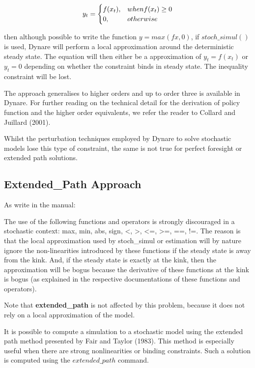 \documentclass[cn,10pt,math=newtx,citestyle=gb7714-2015,bibstyle=gb7714-2015]{elegantbook}
\begin{document}
\begin{equation*}
	y_t=
	\begin{cases}
		f(x_t),& when f(x_t)\ge0\\
		0,\space &otherwise
	\end{cases}
\end{equation*}

then although possible to write the function $y = max(fx,0)$, if $stoch\_simul()$ is used, Dynare will perform a local approximation around the deterministic steady state. The equation will then either be a approximation of $y_t = f(x_t)$ or $y_t = 0$ depending on whether the constraint binds in steady state. The inequality constraint will be lost.

The approach generalises to higher orders and up to order three is available in Dynare. For further reading on the technical detail for the derivation of policy function and the higher order equivalents, we refer the reader to Collard and Juillard (2001).

Whilst the perturbation techniques employed by Dynare to solve stochastic models lose this type of constraint, the same is not true for perfect foresight or extended path solutions.


\subsection{Extended\_Path Approach}

As write in the manual:

The use of the following functions and operators is strongly discouraged in a stochastic context: max, min, abs, sign, <, >, <=, >=, ==, !=. The reason is that the local approximation used by stoch\_simul or estimation will by nature ignore the non-linearities introduced by these functions if the steady state is away from the kink. And, if the steady state is exactly at the kink, then the approximation will be bogus because the derivative of these functions at the kink is bogus (as explained in the respective documentations of these functions and operators).

Note that \textbf{extended\_path} is not affected by this problem, because it does not rely on a local approximation of the model.

It is possible to compute a simulation to a stochastic model using the extended path method presented by Fair and Taylor (1983). This method is especially useful when there are strong nonlinearities or binding constraints. Such a solution is computed using the $extended\_path$ command.
\end{document}

